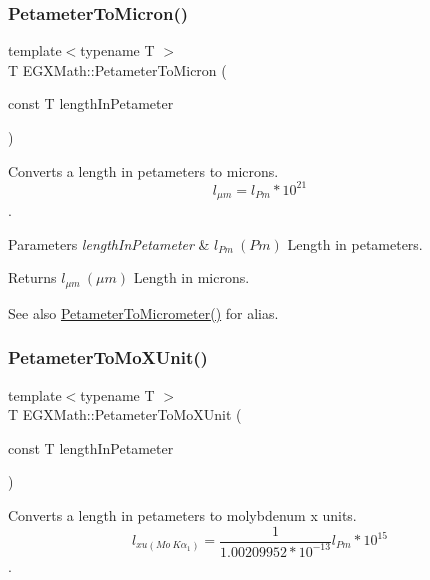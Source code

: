 \subsubsection{\texorpdfstring{Petameter\+To\+Micron()}{PetameterToMicron()}}
{\footnotesize\ttfamily template$<$typename T $>$ \\
T E\+G\+X\+Math\+::\+Petameter\+To\+Micron (\begin{DoxyParamCaption}\item[{const T}]{length\+In\+Petameter }\end{DoxyParamCaption})}



Converts a length in petameters to microns. \[ l_{\mu m}=l_{Pm} * 10^{21} \]. 


\begin{DoxyParams}{Parameters}
{\em length\+In\+Petameter} & $ l_{Pm}\ (Pm)$ Length in petameters. \\
\hline
\end{DoxyParams}
\begin{DoxyReturn}{Returns}
$ l_{\mu m}\ (\mu m)$ Length in microns. 
\end{DoxyReturn}
\begin{DoxySeeAlso}{See also}
\mbox{\hyperlink{group___e_g_x_math-_conversions-_length_conversions-_petameter-_s_i_ga3cbe403b66dcb4d5abca922fc48a9a1c}{Petameter\+To\+Micrometer()}} for alias. 
\end{DoxySeeAlso}
\mbox{\label{group___e_g_x_math-_conversions-_length_conversions-_petameter-_non-_s_i_ga29419ba09bb33a7bc9e23f8cde2efea3}} 
\subsubsection{\texorpdfstring{Petameter\+To\+Mo\+X\+Unit()}{PetameterToMoXUnit()}}
{\footnotesize\ttfamily template$<$typename T $>$ \\
T E\+G\+X\+Math\+::\+Petameter\+To\+Mo\+X\+Unit (\begin{DoxyParamCaption}\item[{const T}]{length\+In\+Petameter }\end{DoxyParamCaption})}



Converts a length in petameters to molybdenum x units. \[ l_{xu(Mo\ K\alpha_1)}=\frac{1}{1.00209952*10^{-13}} l_{Pm} * 10^{15}\]. 


